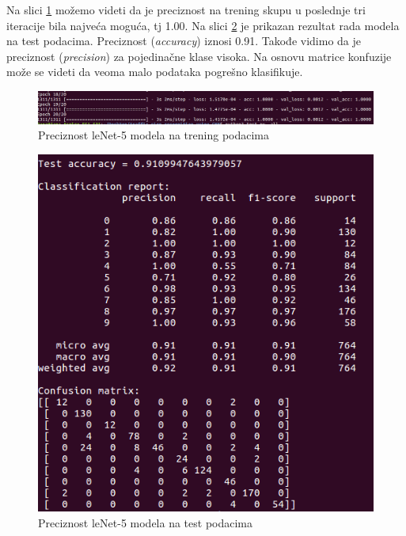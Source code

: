 \documentclass[a4paper]{article}
\begin{document}
Na slici \ref{fig:leNet_trening_acc} možemo videti da je preciznost na trening skupu u poslednje tri iteracije bila najveća moguća, tj 1.00. Na slici \ref{fig:leNet_test_acc} je prikazan rezultat rada modela na test podacima. Preciznost (\textit{accuracy}) iznosi 0.91. Takođe vidimo da je preciznost (\textit{precision}) za pojedinačne klase visoka. Na osnovu matrice konfuzije može se videti da veoma malo podataka pogrešno klasifikuje.


\begin{figure}[h!]
\begin{center}
\includegraphics[scale=0.35]{leNet_trening_acc.png}
\end{center}
\caption{Preciznost leNet-5 modela na trening podacima}
\label{fig:leNet_trening_acc}
\end{figure}

\begin{figure}[h!]
\begin{center}
\includegraphics[scale=0.40]{leNet_test_acc.png}
\end{center}
\caption{Preciznost leNet-5 modela na test podacima}
\label{fig:leNet_test_acc}
\end{figure}
\end{document}
